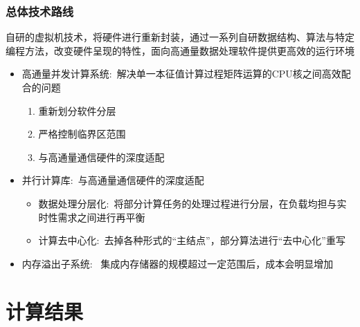 \begin{frame}
	\frametitle{总体技术路线}
	自研的虚拟机技术，将硬件进行重新封装，通过一系列自研数据结构、算法与特定编程方法，改变硬件呈现的特性，面向高通量数据处理软件提供更高效的运行环境
	\begin{itemize}
		\item 高通量并发计算系统:~解决单一本征值计算过程矩阵运算的\textrm{CPU}核之间高效配合的问题
			\begin{enumerate}
\fontsize{7.2pt}{5.2pt}\selectfont
				\item 重新划分软件分层
				\item 严格控制临界区范围
				\item 与高通量通信硬件的深度适配
			\end{enumerate}
		\item 并行计算库:~与高通量通信硬件的深度适配
			\begin{itemize}
\fontsize{7.2pt}{5.2pt}\selectfont
				\item 数据处理分层化:~将部分计算任务的处理过程进行分层，在负载均担与实时性需求之间进行再平衡
				\item 计算去中心化:~去掉各种形式的``主结点''，部分算法进行``去中心化''重写
			\end{itemize}
		\item 内存溢出子系统:~%
			集成内存储器的规模超过一定范围后，成本会明显增加\\
			{\fontsize{7.2pt}{5.2pt}}
	\end{itemize}
\end{frame}

\section{计算结果}

